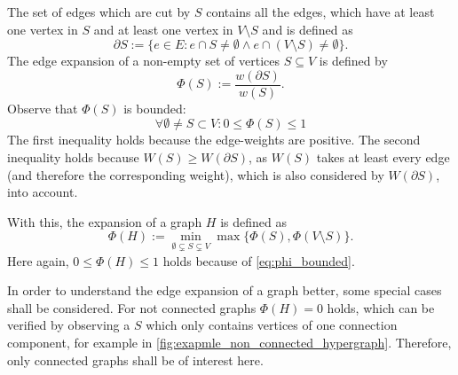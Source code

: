 The set of edges which are cut by $S$ contains all the edges, which have at least one vertex in $S$ and at least one vertex in $V\setminus S$ and is defined as \begin{equation}
\partial S:= \{e\in E : e \cap S \neq \emptyset \land  e \cap (V \setminus S) \neq \emptyset  \}.
\end{equation} 
The edge expansion of a non-empty set of vertices $S \subseteq V$ is defined by \begin{equation}
\Phi(S):= \frac{w(\partial S)}{w(S)}.
\end{equation}
Observe that $\Phi(S)$ is bounded: \begin{equation} \label{eq:phi_bounded}
\forall \emptyset \neq S \subset V : 0\le \Phi(S) \le 1 
\end{equation} The first inequality holds because the edge-weights are positive. The second inequality holds because $W(S) \ge W(\partial S)$, as $W(S)$ takes at least every edge (and therefore the corresponding weight), which is also considered by $W(\partial S)$, into account.


With this, the expansion of a graph $H$ is defined as \begin{equation}
\Phi(H) := \min_{\emptyset \subsetneq S \subsetneq V} \max \{\Phi(S), \Phi(V\setminus S)\}.
\end{equation} Here again, $0\le \Phi(H)\le 1$ holds because of \cref{eq:phi_bounded}.

In order to understand the edge expansion of a graph better, some special cases shall be considered.
For not connected graphs $\Phi(H) = 0$ holds, which can be verified by observing a $S$ which only contains vertices of one connection component, for example in \cref{fig:exapmle_non_connected_hypergraph}. Therefore, only connected graphs shall be of interest here.

